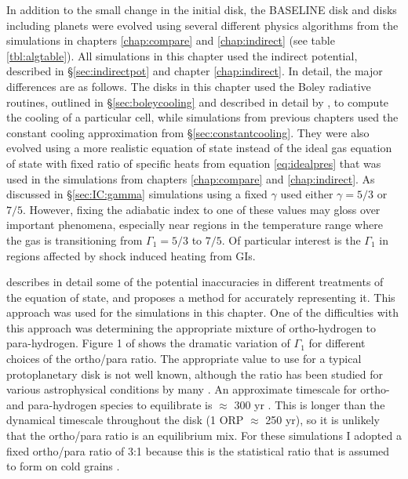 In addition to the small change in the initial disk, the BASELINE disk and disks including planets were evolved using several different physics algorithms from the simulations in chapters \ref{chap:compare} and \ref{chap:indirect} (see table \ref{tbl:algtable}). All simulations in this chapter used the indirect potential, described in \S\ref{sec:indirectpot} and chapter \ref{chap:indirect}. In detail, the major differences are as follows. The disks in this chapter used the Boley radiative routines, outlined in \S\ref{sec:boleycooling} and described in detail by \citet{boley2007b}, to compute the cooling of a particular cell, while simulations from previous chapters used the constant cooling approximation from \S\ref{sec:constantcooling}. They were also evolved using a more realistic  equation of state instead of the ideal gas equation of state with fixed ratio of specific heats from equation \eqref{eq:idealpres} that was used in the simulations from chapters \ref{chap:compare} and \ref{chap:indirect}. As discussed in \S\ref{sec:IC:gamma} simulations using a fixed $\gamma$ used either $\gamma = 5/3$ or $7/5$. However, fixing the adiabatic index to one of these values may gloss over important phenomena, especially near regions in the temperature range where the gas is transitioning from $\Gamma_1 = 5/3$ to $7/5$. Of particular interest is the $\Gamma_1$ in regions affected by shock induced heating from GIs. 

\citet{boley2007a} describes in detail some of the potential inaccuracies in different treatments of the  equation of state, and proposes a method for accurately representing it. This approach was used for the simulations in this chapter. One of the difficulties with this approach was determining the appropriate mixture of ortho-hydrogen to para-hydrogen. Figure 1 of \citet{boley2007a} shows the dramatic variation of $\Gamma_1$ for different choices of the ortho/para ratio. The appropriate value to use for a typical protoplanetary disk is not well known, although the ratio has been studied for various astrophysical conditions by many \citep{osterbrock1962,decampli1978,flower1984,sternberg1999,fuente1999,flower2006}. An approximate timescale for ortho- and para-hydrogen species to equilibrate is $\approx$ 300 yr \citep{boley2007a}. This is longer than the dynamical timescale throughout the disk (1 ORP $\approx$ 250 yr), so it is unlikely that the ortho/para ratio is an equilibrium mix. For these simulations I adopted a fixed ortho/para ratio of 3:1 because this is the statistical ratio that  is assumed to form on cold grains \citep{flower2006}.

